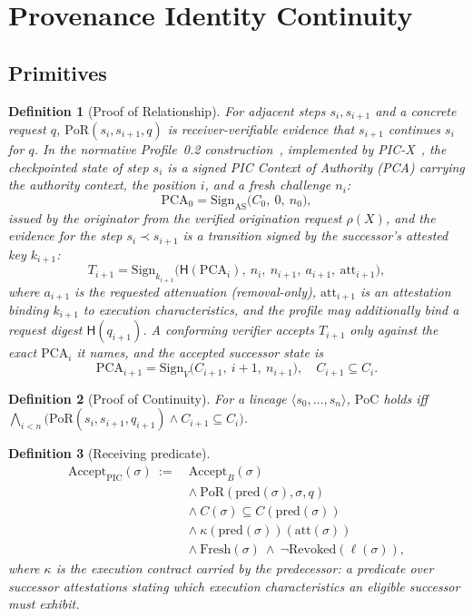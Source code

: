 \documentclass[conference]{IEEEtran}
\newcommand{\Accept}{\mathrm{Accept}}
\newcommand{\PoR}{\mathrm{PoR}}
\newcommand{\PoC}{\mathrm{PoC}}
\newcommand{\Hsh}{\mathsf{H}}
\newtheorem{definition}{Definition}
\begin{document}
\section{Provenance Identity Continuity}\label{sec:pic}

\subsection{Primitives}

\begin{definition}[Proof of Relationship]\label{def:por}
For adjacent steps $s_i,s_{i+1}$ and a concrete request $q$, $\PoR(s_i,s_{i+1},q)$ is receiver-verifiable evidence that $s_{i+1}$ continues $s_i$ for $q$. In the normative Profile~0.2 construction~\cite{picspec}, implemented by PIC-X~\cite{picx}, the checkpointed state of step $s_i$ is a signed \emph{PIC Context of Authority} (PCA) carrying the authority context, the position $i$, and a fresh challenge $n_i$:
\[
\mathrm{PCA}_0=\mathrm{Sign}_{\mathrm{AS}}\big(C_0,\ 0,\ n_0\big),
\]
issued by the originator from the verified origination request $\rho(X)$, and the evidence for the step $s_i \prec s_{i+1}$ is a \emph{transition} signed by the successor's attested key $k_{i+1}$:
\[
T_{i+1}=\mathrm{Sign}_{k_{i+1}}\big(\Hsh(\mathrm{PCA}_i),\ n_i,\ n_{i+1},\ a_{i+1},\ \mathrm{att}_{i+1}\big),
\]
where $a_{i+1}$ is the requested attenuation (removal-only), $\mathrm{att}_{i+1}$ is an attestation binding $k_{i+1}$ to execution characteristics, and the profile may additionally bind a request digest $\Hsh(q_{i+1})$. A conforming verifier accepts $T_{i+1}$ only against the exact $\mathrm{PCA}_i$ it names, and the accepted successor state is
\[
\mathrm{PCA}_{i+1}=\mathrm{Sign}_{V}\big(C_{i+1},\ i{+}1,\ n_{i+1}\big),\quad C_{i+1}\subseteq C_i .
\]
\end{definition}

\begin{definition}[Proof of Continuity]\label{def:poc}
For a lineage $\langle s_0,\dots,s_n\rangle$, $\PoC$ holds iff $\bigwedge_{i<n}\big(\PoR(s_i,s_{i+1},q_{i+1})\wedge C_{i+1}\subseteq C_i\big)$.
\end{definition}

\begin{definition}[Receiving predicate]\label{def:acceptpic}
\begin{align*}
\Accept_{\mathrm{PIC}}(\sigma)\ :=\ &\Accept_B(\sigma)\\
&\wedge\ \PoR(\mathrm{pred}(\sigma),\sigma,q)\\
&\wedge\ C(\sigma)\subseteq C(\mathrm{pred}(\sigma))\\
&\wedge\ \kappa(\mathrm{pred}(\sigma))(\mathrm{att}(\sigma))\\
&\wedge\ \mathrm{Fresh}(\sigma)\ \wedge\ \neg\mathrm{Revoked}(\ell(\sigma)),
\end{align*}
where $\kappa$ is the \emph{execution contract} carried by the predecessor: a predicate over successor attestations stating which execution characteristics an eligible successor must exhibit.
\end{definition}
\end{document}
